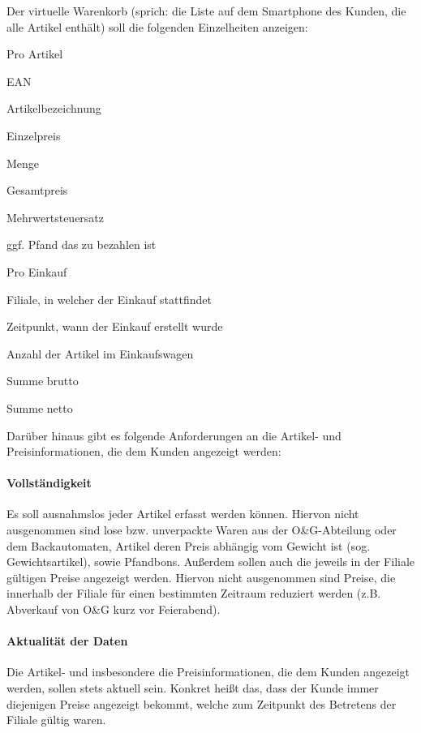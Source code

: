 Der virtuelle Warenkorb (sprich: die Liste auf dem Smartphone des Kunden, die alle Artikel enthält) soll die folgenden Einzelheiten anzeigen:

\begin{seList}
	\item Pro Artikel
	\begin{seList}
		\item EAN
		\item Artikelbezeichnung
		\item Einzelpreis
		\item Menge
		\item Gesamtpreis
		\item Mehrwertsteuersatz
		\item ggf. Pfand das zu bezahlen ist
	\end{seList}
	\item Pro Einkauf
	\begin{seList}
		\item Filiale, in welcher der Einkauf stattfindet
		\item Zeitpunkt, wann der Einkauf erstellt wurde
		\item Anzahl der Artikel im Einkaufswagen
		\item Summe brutto
		\item Summe netto
	\end{seList}
\end{seList}

Darüber hinaus gibt es folgende Anforderungen an die Artikel- und Preisinformationen, die dem Kunden angezeigt werden:
\paragraph{Vollständigkeit}
Es soll ausnahmslos jeder Artikel erfasst werden können. Hiervon nicht ausgenommen sind lose bzw. unverpackte Waren aus der O\&G-Abteilung oder dem Backautomaten, Artikel deren Preis abhängig vom Gewicht ist (sog. Gewichtsartikel), sowie Pfandbons.
Außerdem sollen auch die jeweils in der Filiale gültigen Preise angezeigt werden. Hiervon nicht ausgenommen sind Preise, die innerhalb der Filiale für einen bestimmten Zeitraum reduziert werden (z.B. Abverkauf von O\&G kurz vor Feierabend).

\paragraph{Aktualität der Daten}
Die Artikel- und insbesondere die Preisinformationen, die dem Kunden angezeigt werden, sollen stets aktuell sein. Konkret heißt das, dass der Kunde immer diejenigen Preise angezeigt bekommt, welche zum Zeitpunkt des Betretens der Filiale gültig waren. 

